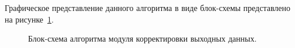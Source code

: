 Графическое представление данного алгоритма в виде блок-схемы представлено на рисунке~\ref{pic:correctAlgo}.

\begin{figure}[H]
\caption{Блок-схема алгоритма модуля корректировки выходных данных.}
\label{pic:correctAlgo}
\end{figure}
